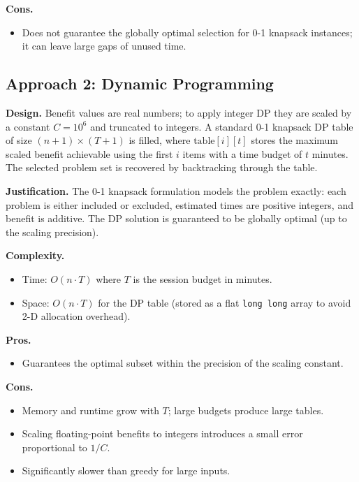 \documentclass{article}
\begin{document}
\textbf{Cons.}
\begin{itemize}
  \item Does not guarantee the globally optimal selection for 0-1
        knapsack instances; it can leave large gaps of unused time.
\end{itemize}
 
\subsection{Approach 2: Dynamic Programming}
 
\textbf{Design.} Benefit values are real numbers; to apply integer DP
they are scaled by a constant $C = 10^6$ and truncated to integers.
A standard 0-1 knapsack DP table of size $(n+1) \times (T+1)$ is
filled, where $\mathrm{table}[i][t]$ stores the maximum scaled benefit
achievable using the first $i$ items with a time budget of $t$ minutes.
The selected problem set is recovered by backtracking through the table.
 
\textbf{Justification.} The 0-1 knapsack formulation models the problem
exactly: each problem is either included or excluded, estimated times
are positive integers, and benefit is additive. The DP solution is
guaranteed to be globally optimal (up to the scaling precision).
 
\textbf{Complexity.}
\begin{itemize}
  \item Time: $O(n \cdot T)$ where $T$ is the session budget in minutes.
  \item Space: $O(n \cdot T)$ for the DP table (stored as a flat
        \texttt{long long} array to avoid 2-D allocation overhead).
\end{itemize}
 
\textbf{Pros.}
\begin{itemize}
  \item Guarantees the optimal subset within the precision of the
        scaling constant.
\end{itemize}
 
\textbf{Cons.}
\begin{itemize}
  \item Memory and runtime grow with $T$; large budgets produce large tables.
  \item Scaling floating-point benefits to integers introduces a small error proportional to $1/C$.
  \item Significantly slower than greedy for large inputs.
\end{itemize}
 
\end{document}
